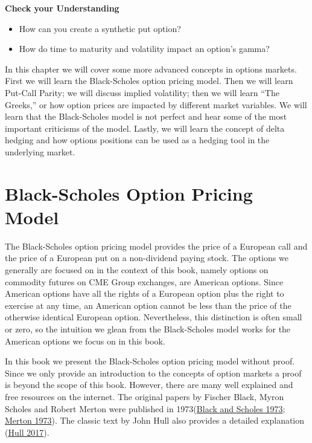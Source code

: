 \documentclass[
]{book}
\begin{document}
\textbf{Check your Understanding}

\begin{itemize}
\item
  How can you create a synthetic put option?
\item
  How do time to maturity and volatility impact an option's gamma?
\end{itemize}

In this chapter we will cover some more advanced concepts in options markets. First we will learn the Black-Scholes option pricing model. Then we will learn Put-Call Parity; we will discuss implied volatility; then we will learn ``The Greeks,'' or how option prices are impacted by different market variables. We will learn that the Black-Scholes model is not perfect and hear some of the most important criticisms of the model. Lastly, we will learn the concept of delta hedging and how options positions can be used as a hedging tool in the underlying market.

\hypertarget{black-scholes-option-pricing-model}{%
\section{Black-Scholes Option Pricing Model}\label{black-scholes-option-pricing-model}}

The Black-Scholes option pricing model provides the price of a European call and the price of a European put on a non-dividend paying stock. The options we generally are focused on in the context of this book, namely options on commodity futures on CME Group exchanges, are American options. Since American options have all the rights of a European option plus the right to exercise at any time, an American option cannot be less than the price of the otherwise identical European option. Nevertheless, this distinction is often small or zero, so the intuition we glean from the Black-Scholes model works for the American options we focus on in this book.

In this book we present the Black-Scholes option pricing model without proof. Since we only provide an introduction to the concepts of option markets a proof is beyond the scope of this book. However, there are many well explained and free resources on the internet. The original papers by Fischer Black, Myron Scholes and Robert Merton were published in 1973(\protect\hyperlink{ref-black1973}{Black and Scholes 1973}; \protect\hyperlink{ref-merton1973}{Merton 1973}). The classic text by John Hull also provides a detailed explanation (\protect\hyperlink{ref-hull2017fundamentals}{Hull 2017}).
\end{document}
